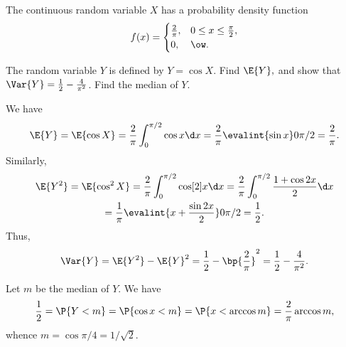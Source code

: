 \begin{problem}
    The continuous random variable $X$ has a probability density function \[f(x) = \begin{cases}
        \frac2\pi, & 0 \leq x \leq \frac\pi2,\\
        0, & \ow.
    \end{cases}\]
    
    The random variable $Y$ is defined by $Y=\cos X.$ Find $\E{Y},$ and show that $\Var{Y} = \frac12 - \frac4{\pi^2}$. Find the median of $Y$.
\end{problem}
\begin{solution}
    We have \[\E{Y} = \E{\cos X} = \frac2\pi \int_0^{\pi/2} \cos{x} \d x = \frac2\pi \evalint{\sin x}0{\pi/2} = \frac2\pi.\] Similarly,
    \begin{gather*}
        \E{Y^2} = \E{\cos^2 X} = \frac2\pi \int_0^{\pi/2} \cos[2]{x} \d x = \frac2\pi \int_0^{\pi/2} \frac{1 + \cos{2x}}{2} \d x\\
        = \frac1\pi \evalint{x + \frac{\sin 2x}2}0{\pi/2} = \frac12.
    \end{gather*}
    Thus, \[\Var{Y} = \E{Y^2} - \E{Y}^2 = \frac12 - \bp{\frac2\pi}^2 = \frac12 - \frac4{\pi^2}.\]

    Let $m$ be the median of $Y$. We have \[\frac12 = \P{Y < m} = \P{\cos x < m} = \P{x < \arccos m} = \frac2\pi \arccos m,\] whence $m = \cos{\pi/4} = 1/\sqrt2$.
\end{solution}

